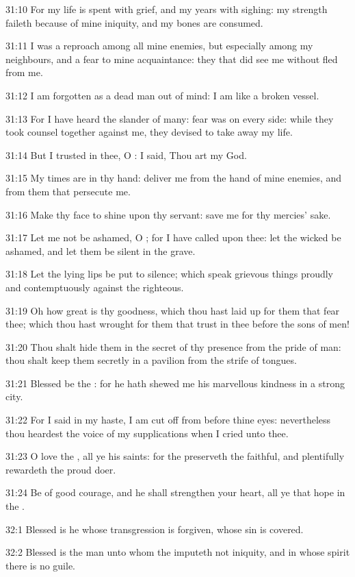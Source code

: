 31:10 For my life is spent with grief, and my years with sighing: my strength faileth because of mine iniquity, and my bones are consumed.

31:11 I was a reproach among all mine enemies, but especially among my neighbours, and a fear to mine acquaintance: they that did see me without fled from me.

31:12 I am forgotten as a dead man out of mind: I am like a broken vessel.

31:13 For I have heard the slander of many: fear was on every side: while they took counsel together against me, they devised to take away my life.

31:14 But I trusted in thee, O \LORD: I said, Thou art my God.

31:15 My times are in thy hand: deliver me from the hand of mine enemies, and from them that persecute me.

31:16 Make thy face to shine upon thy servant: save me for thy mercies' sake.

31:17 Let me not be ashamed, O \LORD; for I have called upon thee: let the wicked be ashamed, and let them be silent in the grave.

31:18 Let the lying lips be put to silence; which speak grievous things proudly and contemptuously against the righteous.

31:19 Oh how great is thy goodness, which thou hast laid up for them that fear thee; which thou hast wrought for them that trust in thee before the sons of men!

31:20 Thou shalt hide them in the secret of thy presence from the pride of man: thou shalt keep them secretly in a pavilion from the strife of tongues.

31:21 Blessed be the \LORD: for he hath shewed me his marvellous kindness in a strong city.

31:22 For I said in my haste, I am cut off from before thine eyes: nevertheless thou heardest the voice of my supplications when I cried unto thee.

31:23 O love the \LORD, all ye his saints: for the \LORD preserveth the faithful, and plentifully rewardeth the proud doer.

31:24 Be of good courage, and he shall strengthen your heart, all ye that hope in the \LORD.



32:1 Blessed is he whose transgression is forgiven, whose sin is covered.

32:2 Blessed is the man unto whom the \LORD imputeth not iniquity, and in whose spirit there is no guile.

